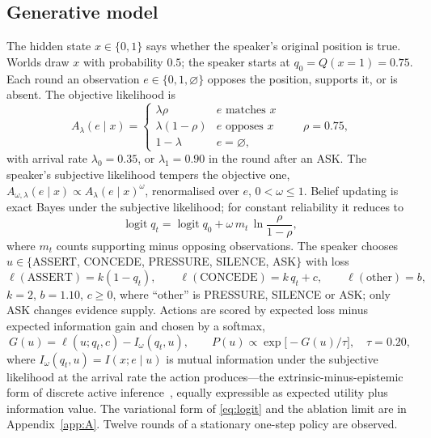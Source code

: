 \documentclass[runningheads]{llncs}
\newcommand{\Iw}{I_{\omega}}
\begin{document}
\subsection{Generative model}
The hidden state $x\in\{0,1\}$ says whether the speaker's original position is true. Worlds draw $x$ with probability $0.5$; the speaker starts at $q_0=Q(x{=}1)=0.75$. Each round an observation $e\in\{0,1,\varnothing\}$ opposes the position, supports it, or is absent. The objective likelihood is
\begin{equation}
A_\lambda(e\mid x)=\begin{cases}\lambda\rho & e \text{ matches } x\\ \lambda(1-\rho) & e \text{ opposes } x\\ 1-\lambda & e=\varnothing,\end{cases}\qquad \rho=0.75,
\label{eq:A}
\end{equation}
with arrival rate $\lambda_0=0.35$, or $\lambda_1=0.90$ in the round after an ASK. The speaker's subjective likelihood tempers the objective one, $A_{\omega,\lambda}(e\mid x)\propto A_\lambda(e\mid x)^{\omega}$, renormalised over $e$, $0<\omega\le1$. Belief updating is exact Bayes under the subjective likelihood; for constant reliability it reduces to
\begin{equation}
\operatorname{logit} q_t=\operatorname{logit} q_0+\omega\,m_t\,\ln\frac{\rho}{1-\rho},
\label{eq:logit}
\end{equation}
where $m_t$ counts supporting minus opposing observations. The speaker chooses $u\in\{$ASSERT, CONCEDE, PRESSURE, SILENCE, ASK$\}$ with loss
\begin{equation}
\ell(\text{ASSERT})=k(1-q_t),\qquad \ell(\text{CONCEDE})=k\,q_t+c,\qquad \ell(\text{other})=b,
\label{eq:loss}
\end{equation}
$k=2$, $b=1.10$, $c\ge0$, where ``other'' is PRESSURE, SILENCE or ASK; only ASK changes evidence supply. Actions are scored by expected loss minus expected information gain and chosen by a softmax,
\begin{equation}
G(u)=\ell(u;q_t,c)-\Iw(q_t,u),\qquad P(u)\propto\exp\!\big[-G(u)/\tau\big],\quad \tau=0.20,
\label{eq:policy}
\end{equation}
where $\Iw(q_t,u)=I(x;e\mid u)$ is mutual information under the subjective likelihood at the arrival rate the action produces---the extrinsic-minus-epistemic form of discrete active inference~\cite{friston2015epistemic}, equally expressible as expected utility plus information value. The variational form of \eqref{eq:logit} and the ablation limit are in Appendix~\ref{app:A}. Twelve rounds of a stationary one-step policy are observed.
\end{document}
